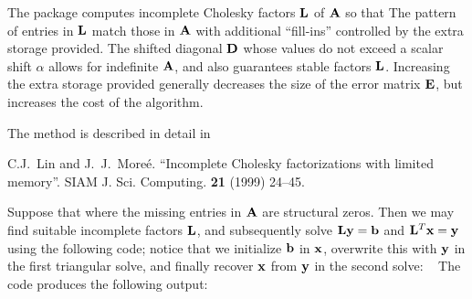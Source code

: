 \documentclass{galahad}
\begin{document}

\galmethod
The package computes incomplete Cholesky factors ${\mathbf{L}}$ of ${\mathbf{A}}$ so that
The pattern of entries in ${\mathbf{L}}$ match those in ${\mathbf{A}}$ with additional
``fill-ins'' controlled by the extra storage provided. The shifted diagonal
${\mathbf{D}}$ whose values do not exceed a scalar shift $\alpha$ allows for 
indefinite ${\mathbf{A}}$, and also guarantees stable factors ${\mathbf{L}}$. Increasing the
extra storage provided generally decreases the size of the error matrix
${\mathbf{E}}$, but increases the cost of the algorithm.

\vspace*{1mm}

\galreference
\vspace*{1mm}

\noindent
The method is described in detail in
\vspace*{1mm}

\noindent
C.\-J.\ Lin and J.\ J.\ More\'{e}. ``Incomplete Cholesky factorizations 
with limited memory''.  SIAM J. Sci. Computing. {\bf 21} (1999) 24--45.


\galexamples
Suppose that 
where the missing entries in ${\mathbf{A}}$ are structural zeros. Then we may find 
suitable incomplete factors ${\mathbf{L}}$, and subsequently solve
${\mathbf{L}} {\mathbf{y}} = {\mathbf{b}}$ and ${\mathbf{L}}^T {\mathbf{x}} = {\mathbf{y}}$ using the following code; 
notice that we initialize ${\mathbf{b}}$ in ${\mathbf{x}}$, overwrite this with ${\mathbf{y}}$ in the
first triangular solve, and finally recover ${\mathbf{x}}$ from ${\mathbf{y}}$
in the second solve:
{\tt \small
\VerbatimInput{\packageexample}
}
\noindent
The code produces the following output:
{\tt \small
\VerbatimInput{\packageresults}
}
\noindent
\end{document}
